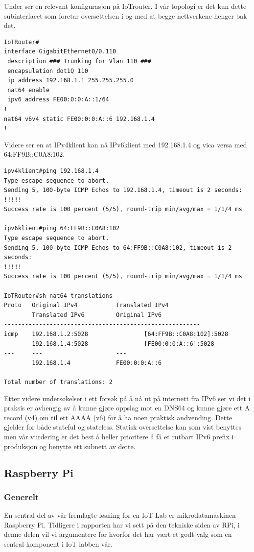 \documentclass{article}
\begin{document}
Under ser en relevant konfigurasjon på IoTrouter. I vår topologi er det kun dette subinterfacet som foretar oversettelsen i og med at begge nettverkene henger bak det. 

\begin{verbatim}
IoTRouter#
interface GigabitEthernet0/0.110
 description ### Trunking for Vlan 110 ###
 encapsulation dot1Q 110
 ip address 192.168.1.1 255.255.255.0
 nat64 enable
 ipv6 address FE00:0:0:A::1/64
!
nat64 v6v4 static FE00:0:0:A::6 192.168.1.4
!
\end{verbatim} Videre ser en at IPv4klient kan nå IPv6klient med 192.168.1.4 og vica versa med 64:FF9B::C0A8:102.

\begin{verbatim}
ipv4klient#ping 192.168.1.4
Type escape sequence to abort.
Sending 5, 100-byte ICMP Echos to 192.168.1.4, timeout is 2 seconds:
!!!!!
Success rate is 100 percent (5/5), round-trip min/avg/max = 1/1/4 ms

ipv6klient#ping 64:FF9B::C0A8:102
Type escape sequence to abort.
Sending 5, 100-byte ICMP Echos to 64:FF9B::C0A8:102, timeout is 2 seconds:
!!!!!
Success rate is 100 percent (5/5), round-trip min/avg/max = 1/1/4 ms

IoTRouter#sh nat64 translations
Proto   Original IPv4           Translated IPv4
        Translated IPv6         Original IPv6
--------------------------------------------------------
icmp    192.168.1.2:5028                [64:FF9B::C0A8:102]:5028
        192.168.1.4:5028                [FE00:0:0:A::6]:5028
---     ---                     ---
        192.168.1.4             FE00:0:0:A::6

Total number of translations: 2

\end{verbatim}

Etter videre undersøkelser i ett forsøk på å nå ut på internett fra IPv6 ser vi det i praksis er avhengig av å kunne gjøre oppslag mot en DNS64 og kunne gjøre ett A record (v4) om til ett AAAA (v6) for å ha noen praktisk andvending. Dette gjelder for både stateful og stateless. Statisk oversettelse kan som vist benyttes men vår vurdering er det best å heller prioritere å få et rutbart IPv6 prefix i produksjon og benytte ett subnett av dette.

\subsection{Raspberry Pi}

\subsubsection{Generelt}
En sentral del av vår fremlagte løsning for en IoT Lab er mikrodatamaskinen Raspberry Pi. Tidligere i rapporten har vi sett på den tekniske siden av RPi, i denne delen vil vi argumentere for hvorfor det har vært et godt valg som en sentral komponent i IoT labben vår.
\end{document}
